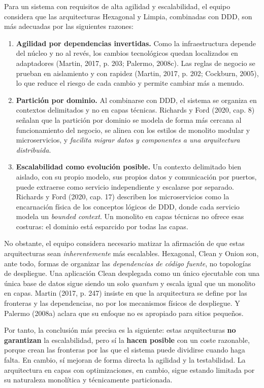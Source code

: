 \documentclass[11pt,a4paper]{article}
\begin{document}
Para un sistema con requisitos de alta agilidad y escalabilidad, el equipo considera que las arquitecturas Hexagonal y Limpia, combinadas con DDD, son más adecuadas por las siguientes razones:

\begin{enumerate}[leftmargin=1.5em]
  \item \textbf{Agilidad por dependencias invertidas.} Como la infraestructura depende del núcleo y no al revés, los cambios tecnológicos quedan localizados en adaptadores (Martin, 2017, p. 203; Palermo, 2008c). Las reglas de negocio se prueban en aislamiento y con rapidez (Martin, 2017, p. 202; Cockburn, 2005), lo que reduce el riesgo de cada cambio y permite cambiar más a menudo.
  \item \textbf{Partición por dominio.} Al combinarse con DDD, el sistema se organiza en contextos delimitados y no en capas técnicas. Richards y Ford (2020, cap. 8) señalan que la partición por dominio se modela de forma más cercana al funcionamiento del negocio, se alinea con los estilos de monolito modular y microservicios, y \emph{facilita migrar datos y componentes a una arquitectura distribuida}.
  \item \textbf{Escalabilidad como evolución posible.} Un contexto delimitado bien aislado, con su propio modelo, sus propios datos y comunicación por puertos, puede extraerse como servicio independiente y escalarse por separado. Richards y Ford (2020, cap. 17) describen los microservicios como la encarnación física de los conceptos lógicos de DDD, donde cada servicio modela un \emph{bounded context}. Un monolito en capas técnicas no ofrece esas costuras: el dominio está esparcido por todas las capas.
\end{enumerate}

No obstante, el equipo considera necesario matizar la afirmación de que estas arquitecturas sean \emph{inherentemente} más escalables. Hexagonal, Clean y Onion son, ante todo, formas de organizar las \emph{dependencias de código fuente}, no topologías de despliegue. Una aplicación Clean desplegada como un único ejecutable con una única base de datos sigue siendo un solo \emph{quantum} y escala igual que un monolito en capas. Martin (2017, p. 247) insiste en que la arquitectura se define por las fronteras y las dependencias, no por los mecanismos físicos de despliegue. Y Palermo (2008a) aclara que su enfoque no es apropiado para sitios pequeños.

Por tanto, la conclusión más precisa es la siguiente: estas arquitecturas \textbf{no garantizan} la escalabilidad, pero sí la \textbf{hacen posible} con un coste razonable, porque crean las fronteras por las que el sistema puede dividirse cuando haga falta. En cambio, sí mejoran de forma directa la agilidad y la testabilidad. La arquitectura en capas con optimizaciones, en cambio, sigue estando limitada por su naturaleza monolítica y técnicamente particionada.
\end{document}
